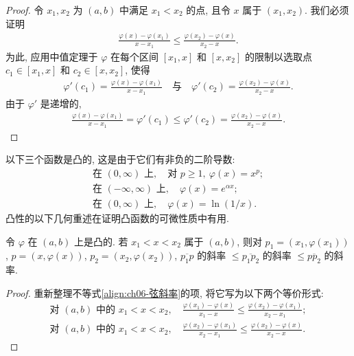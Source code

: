 \documentclass[../../main.tex]{subfiles}
\begin{document}
\begin{proof}
令 $x_{1},x_{2}$ 为 $(a,b)$ 中满足 $x_{1}<x_{2}$ 的点, 且令 $x$ 属于 $(x_{1},x_{2})$. 我们必须证明
\begin{align*}
\frac{\varphi(x)-\varphi(x_{1})}{x-x_{1}}\leqslant\frac{\varphi(x_{2})-\varphi(x)}{x_{2}-x}.
\end{align*}
为此, 应用中值定理于 $\varphi$ 在每个区间 $[x_{1},x]$ 和 $[x,x_{2}]$ 的限制以选取点 $c_{1}\in[x_{1},x]$ 和 $c_{2}\in[x,x_{2}]$, 使得
\begin{align*}
\varphi'(c_{1})=\frac{\varphi(x)-\varphi(x_{1})}{x-x_{1}}\quad\text{与}\quad\varphi'(c_{2})=\frac{\varphi(x_{2})-\varphi(x)}{x_{2}-x}.
\end{align*}
由于 $\varphi'$ 是递增的,
\begin{align*}
\frac{\varphi(x)-\varphi(x_{1})}{x-x_{1}}=\varphi'(c_{1})\leqslant\varphi'(c_{2})=\frac{\varphi(x_{2})-\varphi(x)}{x_{2}-x}.
\end{align*}
\end{proof}

\begin{example}\label{example:ch06-凸函数例子}
以下三个函数是凸的, 这是由于它们有非负的二阶导数:
\begin{align*}
\text{在 }(0,\infty)\text{ 上},\quad\text{对 }p\geqslant 1,\ \varphi(x)=x^{p};\\
\text{在 }(-\infty,\infty)\text{ 上},\quad\varphi(x)=e^{\alpha x};\\
\text{在 }(0,\infty)\text{ 上},\quad\varphi(x)=\ln(1/x).
\end{align*}
凸性的以下几何重述在证明凸函数的可微性质中有用.
\end{example}

\begin{lemma}[弦的斜率引理]\label{lemma:ch06-弦斜率}
令 $\varphi$ 在 $(a,b)$ 上是凸的. 若 $x_{1}<x<x_{2}$ 属于 $(a,b)$, 则对 $p_{1}=(x_{1},\varphi(x_{1}))$, $p=(x,\varphi(x))$, $p_{2}=(x_{2},\varphi(x_{2}))$, $\overline{p_{1}p}$ 的斜率 $\leqslant\overline{p_{1}p_{2}}$ 的斜率 $\leqslant\overline{p p_{2}}$ 的斜率.
\end{lemma}

\begin{proof}
重新整理不等式\eqref{align:ch06-弦斜率}的项, 将它写为以下两个等价形式:
\begin{align*}
\text{对 }(a,b)\text{ 中的 }x_{1}<x<x_{2},\quad\frac{\varphi(x_{1})-\varphi(x)}{x_{1}-x}\leqslant\frac{\varphi(x_{2})-\varphi(x_{1})}{x_{2}-x_{1}};\\
\text{对 }(a,b)\text{ 中的 }x_{1}<x<x_{2},\quad\frac{\varphi(x_{2})-\varphi(x_{1})}{x_{2}-x_{1}}\leqslant\frac{\varphi(x_{2})-\varphi(x)}{x_{2}-x}.
\end{align*}
\end{proof}
\end{document}
